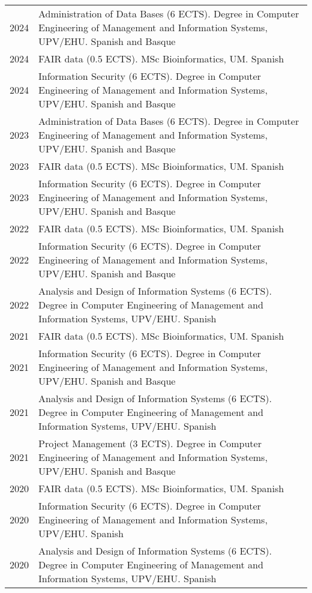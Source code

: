 \documentclass[11pt,fullpage]{article}
\begin{document}
\begin{longtable}{p{0.5in}|p{5.5in}}
2024 & Administration of Data Bases (6 ECTS). Degree in Computer Engineering of Management and Information Systems, UPV/EHU. Spanish and Basque \\
2024 & FAIR data (0.5 ECTS). MSc Bioinformatics, UM. Spanish \\
2024 & Information Security (6 ECTS). Degree in Computer Engineering of Management and Information Systems, UPV/EHU. Spanish and Basque \\
2023 & Administration of Data Bases (6 ECTS). Degree in Computer Engineering of Management and Information Systems, UPV/EHU. Spanish and Basque \\
2023 & FAIR data (0.5 ECTS). MSc Bioinformatics, UM. Spanish \\
2023 & Information Security (6 ECTS). Degree in Computer Engineering of Management and Information Systems, UPV/EHU. Spanish and Basque \\
2022 & FAIR data (0.5 ECTS). MSc Bioinformatics, UM. Spanish \\
2022 & Information Security (6 ECTS). Degree in Computer Engineering of Management and Information Systems, UPV/EHU. Spanish and Basque \\
2022 & Analysis and Design of Information Systems (6 ECTS). Degree in Computer Engineering of Management and Information Systems, UPV/EHU. Spanish \\  
2021 & FAIR data (0.5 ECTS). MSc Bioinformatics, UM. Spanish \\
2021 & Information Security (6 ECTS). Degree in Computer Engineering of Management and Information Systems, UPV/EHU. Spanish and Basque \\
2021 & Analysis and Design of Information Systems (6 ECTS). Degree in Computer Engineering of Management and Information Systems, UPV/EHU. Spanish \\
2021 & Project Management (3 ECTS). Degree in Computer Engineering of Management and Information Systems, UPV/EHU. Spanish and Basque \\
2020 & FAIR data (0.5 ECTS). MSc Bioinformatics, UM. Spanish \\
2020 & Information Security (6 ECTS). Degree in Computer Engineering of Management and Information Systems, UPV/EHU. Spanish \\
2020 & Analysis and Design of Information Systems (6 ECTS). Degree in Computer Engineering of Management and Information Systems, UPV/EHU. Spanish \\

\end{longtable}
\end{document}
